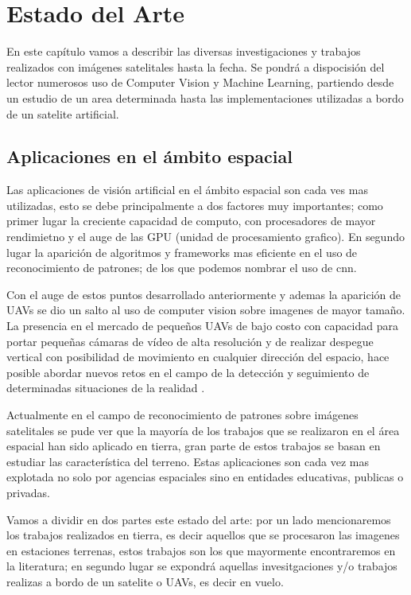 \chapter{Estado del Arte} \label{chap:estadodelarte}


En este capítulo vamos a describir las diversas investigaciones y trabajos realizados con imágenes satelitales hasta la fecha. Se pondrá a dispocisión del lector numerosos uso de Computer Vision y Machine Learning, partiendo desde un estudio de un area determinada  hasta las implementaciones utilizadas a bordo de un satelite artificial.


\section{Aplicaciones en el ámbito espacial}\label{sec:estadodelacuestion}

Las aplicaciones de visión artificial en el ámbito espacial son cada ves mas utilizadas, esto se debe principalmente a dos factores muy importantes; como primer lugar la creciente capacidad de computo, con procesadores de mayor rendimietno y el auge de las GPU (unidad de procesamiento grafico). En segundo lugar la aparición de algoritmos y frameworks mas eficiente en el uso de reconocimiento de patrones; de los que podemos nombrar el uso de \ac{cnn}. 


Con el auge de estos puntos desarrollado anteriormente y ademas la aparición de UAVs se dio un salto al uso de computer vision sobre imagenes de mayor tamaño. La presencia en el mercado de pequeños UAVs de bajo costo con capacidad para portar pequeñas cámaras de vídeo de alta resolución y de realizar despegue vertical con posibilidad de movimiento en cualquier dirección del espacio, hace posible abordar nuevos retos en el campo de la detección y seguimiento de determinadas situaciones de la realidad \citep{Lanillos}.

Actualmente en el campo de reconocimiento de patrones sobre imágenes satelitales se pude ver que la mayoría de los trabajos que se realizaron en el área espacial han sido aplicado en tierra, gran parte de estos trabajos se basan en estudiar las característica del terreno. Estas aplicaciones son cada vez mas explotada no solo por agencias espaciales sino en entidades educativas, publicas o privadas. 


Vamos a dividir en dos partes este estado del arte: por un lado mencionaremos los trabajos realizados en tierra, es decir aquellos que se procesaron las imagenes en estaciones terrenas, estos trabajos son los que mayormente encontraremos en la literatura; en segundo lugar se expondrá aquellas invesitgaciones y/o trabajos realizas a bordo de un satelite o UAVs, es decir en vuelo.

